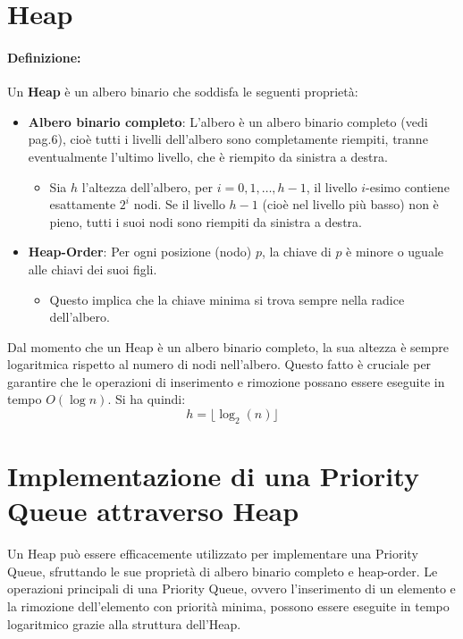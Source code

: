 \section{Heap}
\paragraph{Definizione:}Un \textbf{Heap} è un albero binario che soddisfa le seguenti proprietà:
\begin{itemize}
    \item \textbf{Albero binario completo}: L'albero è un albero binario completo (vedi pag.6), cioè tutti i livelli dell'albero sono completamente riempiti, tranne eventualmente l'ultimo livello, che è riempito da sinistra a destra.
        \begin{itemize}
            \item Sia $h$ l'altezza dell'albero, per $i = 0, 1, \ldots, h-1$, il livello $i$-esimo contiene esattamente $2^i$ nodi. Se il livello $h-1$ (cioè nel livello più basso) non è pieno, tutti i suoi nodi sono riempiti da sinistra a destra.
        \end{itemize}
    \item \textbf{Heap-Order}: Per ogni posizione (nodo) $p$, la chiave di $p$ è minore o uguale alle chiavi dei suoi figli. 
        \begin{itemize}
            \item Questo implica che la chiave minima si trova sempre nella radice dell'albero.
        \end{itemize}
\end{itemize}
Dal momento che un Heap è un albero binario completo, la sua altezza è sempre logaritmica rispetto al numero di nodi nell'albero. Questo fatto è cruciale per garantire che le operazioni di inserimento e rimozione possano essere eseguite in tempo $O(\log n)$.
Si ha quindi: 
\[
h = \lfloor \log_2(n) \rfloor
\]



\section{Implementazione di una Priority Queue attraverso Heap}
Un Heap può essere efficacemente utilizzato per implementare una Priority Queue, sfruttando le sue proprietà di albero binario completo e heap-order. Le operazioni principali di una Priority Queue, ovvero l'inserimento di un elemento e la rimozione dell'elemento con priorità minima, possono essere eseguite in tempo logaritmico grazie alla struttura dell'Heap.

